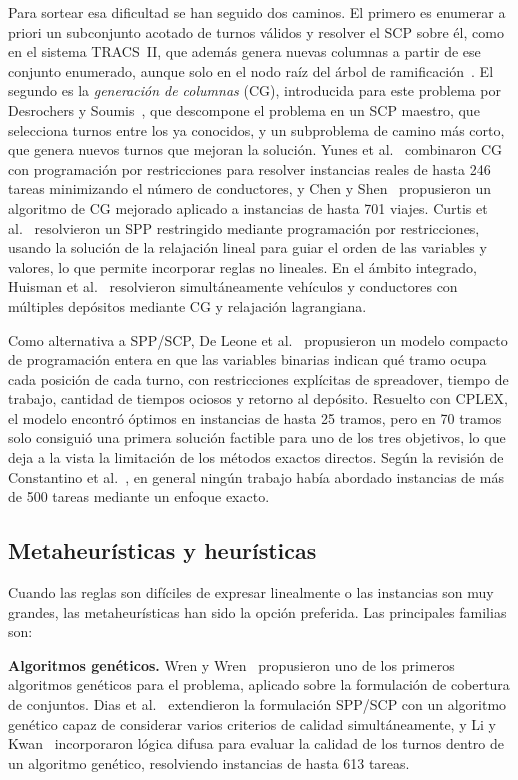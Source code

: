 \documentclass[letter, 10pt]{article}
\begin{document}
Para sortear esa dificultad se han seguido dos caminos. El primero es enumerar a priori un subconjunto acotado de turnos válidos y resolver el SCP sobre él, como en el sistema TRACS~II, que además genera nuevas columnas a partir de ese conjunto enumerado, aunque solo en el nodo raíz del árbol de ramificación~\cite{Fores2002}. El segundo es la \emph{generación de columnas} (CG), introducida para este problema por Desrochers y Soumis~\cite{DesrochersSoumis1989}, que descompone el problema en un SCP maestro, que selecciona turnos entre los ya conocidos, y un subproblema de camino más corto, que genera nuevos turnos que mejoran la solución. Yunes et al.~\cite{Yunes2005} combinaron CG con programación por restricciones para resolver instancias reales de hasta 246 tareas minimizando el número de conductores, y Chen y Shen~\cite{ChenShen2013} propusieron un algoritmo de CG mejorado aplicado a instancias de hasta 701 viajes. Curtis et al.~\cite{Curtis1999} resolvieron un SPP restringido mediante programación por restricciones, usando la solución de la relajación lineal para guiar el orden de las variables y valores, lo que permite incorporar reglas no lineales. En el ámbito integrado, Huisman et al.~\cite{Huisman2005} resolvieron simultáneamente vehículos y conductores con múltiples depósitos mediante CG y relajación lagrangiana.

Como alternativa a SPP/SCP, De Leone et al.~\cite{DeLeone2011a} propusieron un modelo compacto de programación entera en que las variables binarias indican qué tramo ocupa cada posición de cada turno, con restricciones explícitas de spreadover, tiempo de trabajo, cantidad de tiempos ociosos y retorno al depósito. Resuelto con CPLEX, el modelo encontró óptimos en instancias de hasta 25 tramos, pero en 70 tramos solo consiguió una primera solución factible para uno de los tres objetivos, lo que deja a la vista la limitación de los métodos exactos directos. Según la revisión de Constantino et al.~\cite{Constantino2017}, en general ningún trabajo había abordado instancias de más de 500 tareas mediante un enfoque exacto.

\subsection{Metaheurísticas y heurísticas}
Cuando las reglas son difíciles de expresar linealmente o las instancias son muy grandes, las metaheurísticas han sido la opción preferida. Las principales familias son:

\textbf{Algoritmos genéticos.} Wren y Wren~\cite{WrenWren1995} propusieron uno de los primeros algoritmos genéticos para el problema, aplicado sobre la formulación de cobertura de conjuntos. Dias et al.~\cite{Dias2002} extendieron la formulación SPP/SCP con un algoritmo genético capaz de considerar varios criterios de calidad simultáneamente, y Li y Kwan~\cite{LiKwan2003} incorporaron lógica difusa para evaluar la calidad de los turnos dentro de un algoritmo genético, resolviendo instancias de hasta 613 tareas.
\end{document}
